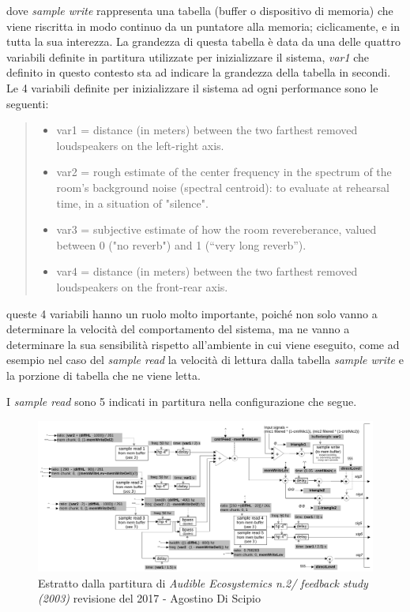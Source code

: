 dove \textit{sample write} rappresenta una tabella (buffer o dispositivo di memoria) 
che viene riscritta in modo continuo da un puntatore alla memoria;
ciclicamente, e in tutta la sua interezza.
La grandezza di questa tabella è data da una delle quattro variabili definite 
in partitura utilizzate per inizializzare il sistema, \textit{var1} che definito in questo contesto sta ad indicare
la grandezza della tabella in secondi.
Le 4 variabili definite per inizializzare il sistema ad ogni performance sono le seguenti:

\begin{quote}
\begin{itemize}
  \item var1 = distance (in meters) between the two farthest removed loudspeakers on the left-right axis.
  \item var2 = rough estimate of the center frequency in the spectrum of the room’s background noise (spectral centroid): to evaluate at rehearsal time, in a situation of "silence".
  \item var3 = subjective estimate of how the room revereberance, valued between 0 ("no reverb") and 1 (“very long reverb”).
  \item var4 = distance (in meters) between the two farthest removed loudspeakers on the front-rear axis.
\end{itemize}
\end{quote}

queste 4 variabili hanno un ruolo molto importante, poiché non solo vanno a determinare la velocità del
comportamento del sistema, ma ne vanno a determinare la sua sensibilità rispetto all'ambiente in cui viene 
eseguito, come ad esempio nel caso del \textit{sample read} la velocità di lettura dalla tabella \textit{sample write} 
e la porzione di tabella che ne viene letta.

I \textit{sample read} sono 5 indicati in partitura nella configurazione che segue.

\clearpage

\begin{figure}[h!]
\begin{center}
\includegraphics[width=14cm]{figures/SAMPLERSFeedbackstudy2017.pdf}
\caption{Estratto dalla partitura di \textit{Audible Ecosystemics n.2/ feedback study (2003)}
revisione del 2017 - Agostino Di Scipio} 
\vspace{0.5cm}
\end{center}
\end{figure} 

